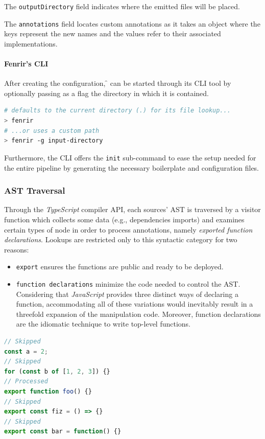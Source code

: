 The \verb|outputDirectory| field indicates where the emitted files will be placed.

The \verb|annotations| field locates custom annotations as it takes an object
where the keys represent the new names and the values refer to their associated implementations.

\paragraph{\textbf{Fenrir's CLI}}
After creating the configuration, \f{} can be started through its CLI tool
by optionally passing as a flag the directory in which it is contained.
\begin{lstlisting}[language=bash, style=bashstyle]
# defaults to the current directory (.) for its file lookup...
> fenrir
# ...or uses a custom path
> fenrir -g input-directory
\end{lstlisting}
Furthermore, the CLI offers the \verb|init| sub-command to ease the setup needed for the entire pipeline
by generating the necessary boilerplate and configuration files.

\subsubsection{AST Traversal}

Through the \textit{TypeScript} compiler API, each sources' AST is traversed
by a visitor function which collects some data (e.g., dependencies imports) and examines
certain types of node in order to process annotations, namely \textit{exported function declarations}.
Lookups are restricted only to this syntactic category for two reasons:
\begin{itemize}
  \item \verb|export| ensures the functions are public and ready to be deployed.
  \item \verb|function declarations| minimize the code needed to control the AST.
    Considering that \textit{JavaScript} provides three distinct ways of declaring a function,
    accommodating all of these variations would inevitably result in a threefold expansion of the manipulation code.
    Moreover, function declarations are the idiomatic technique to write top-level functions.
\end{itemize}

\begin{lstlisting}[language=javascript, caption={Examples of processed or skipped nodes.}]
// Skipped
const a = 2;
// Skipped
for (const b of [1, 2, 3]) {}
// Processed
export function foo() {}
// Skipped
export const fiz = () => {}
// Skipped
export const bar = function() {}
\end{lstlisting}

